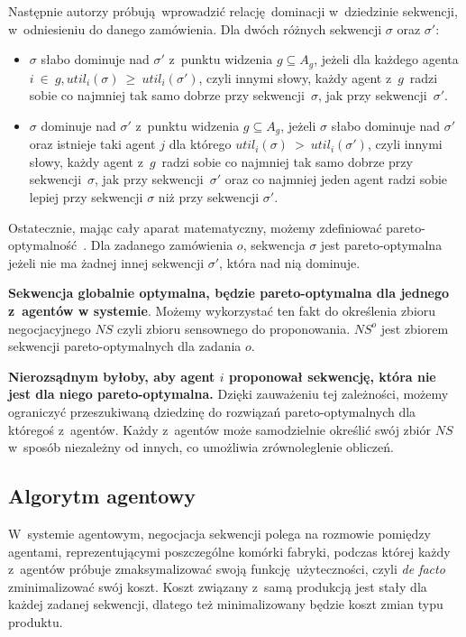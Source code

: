 Następnie autorzy próbują wprowadzić relację dominacji w~dziedzinie sekwencji, w~odniesieniu do danego zamówienia. Dla dwóch różnych sekwencji $\sigma$ oraz $\sigma'$:
\begin{itemize}
    \item $\sigma$ słabo dominuje nad $\sigma'$ z~punktu widzenia $g \subseteq A_{g}$, jeżeli dla każdego agenta $i~\in~g, util_{i}(\sigma)~\geq~util_{i}(\sigma')$, czyli innymi słowy, każdy agent z~$g$~radzi sobie co najmniej tak samo dobrze przy sekwencji~$\sigma$, jak przy sekwencji~$\sigma'$. 

    \item $\sigma$ dominuje nad $\sigma'$ z~punktu widzenia $g \subseteq A_{g}$, jeżeli $\sigma$ słabo dominuje nad $\sigma'$  oraz istnieje taki agent $j$ dla którego $util_{i}(\sigma)~>~util_{i}(\sigma')$, czyli innymi słowy, każdy agent z~$g$~radzi sobie co najmniej tak samo dobrze przy sekwencji~$\sigma$, jak przy sekwencji~$\sigma'$ oraz co najmniej jeden agent radzi sobie lepiej przy sekwencji $\sigma$ niż przy sekwencji $\sigma'$. 
\end{itemize}

Ostatecznie, mając cały aparat matematyczny, możemy zdefiniować pareto-optymalność~\cite{luce1958games}. Dla zadanego zamówienia $o$, sekwencja $\sigma$ jest pareto-optymalna jeżeli nie ma żadnej innej sekwencji $\sigma'$, która nad nią dominuje.

\textbf{Sekwencja globalnie optymalna, będzie pareto-optymalna dla jednego z~agentów w systemie}. Możemy wykorzystać ten fakt do określenia zbioru negocjacyjnego $NS$ czyli zbioru sensownego do proponowania. $NS^{o}$ jest zbiorem sekwencji pareto-optymalnych dla zadania $o$. 

\textbf{Nierozsądnym byłoby, aby agent $i$ proponował sekwencję, która nie jest dla niego pareto-optymalna.} Dzięki zauważeniu tej zależności, możemy ograniczyć przeszukiwaną dziedzinę do rozwiązań pareto-optymalnych dla któregoś z~agentów. Każdy z~agentów może samodzielnie określić swój zbiór $NS$ w~sposób niezależny od innych, co umożliwia zrównoleglenie obliczeń.


\subsection{Algorytm agentowy}
W~systemie agentowym, negocjacja sekwencji polega na rozmowie pomiędzy agentami, reprezentującymi poszczególne komórki fabryki, podczas której każdy z~agentów próbuje zmaksymalizować swoją funkcję użyteczności, czyli \emph{de facto} zminimalizować swój koszt. Koszt związany z~samą produkcją jest stały dla każdej zadanej sekwencji, dlatego też minimalizowany będzie koszt zmian typu produktu.

